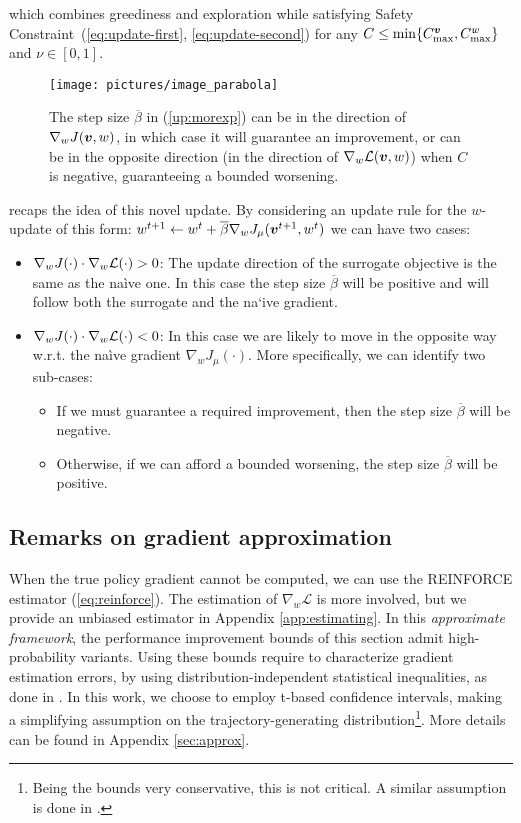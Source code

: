 which combines greediness and exploration while satisfying Safety Constraint~(\ref{eq:update-first}, \ref{eq:update-second}) for any ${C\leq\min\{C_{\text{max}}^{\vv},C_{\text{max}}^{w}\}}$ and $\nu\in[0,1]$. 

\begin{figure}
\texttt{[image: pictures/image\_parabola]}
\caption{The step size $\overline{\beta}$ in (\ref{up:morexp}) can be in the direction of $\gradJ[w]{\vv, w}$, in which case it will guarantee an improvement, or can be in the opposite direction (in the direction of $\gradDelta(\vv, w)$) when $C$ is negative, guaranteeing a bounded worsening. }
\label{fig:boobs}
\end{figure}

 recaps the idea of this novel update. By considering an update rule for the $w$-update of this form: $w^{t+1} \gets w^t + \overline{\beta} \nabla_w J_\mu(\vv^{t+1}, w^t)$ we can have two cases:
\begin{itemize}
\item $\nabla_w J(\cdot) \cdot \nabla_w \Deltav(\cdot) > 0$: The update direction of the surrogate objective is the same as the na\`ive one. In this case the step size $\overline{\beta}$ will be positive and will follow both the surrogate and the na`ive gradient.
\item $\nabla_w J(\cdot) \cdot \nabla_w \Deltav(\cdot) < 0$: In this case we are likely to move in the opposite way w.r.t. the na\`ive gradient $\nabla_w J_\mu(\cdot)$. More specifically, we can identify two sub-cases:
\begin{itemize}
\item If we must guarantee a required improvement, then the step size $\overline{\beta}$ will be negative.
\item Otherwise, if we can afford a bounded worsening, the step size $\overline{\beta}$ will be positive.
\end{itemize}
\end{itemize}

\subsection{Remarks on gradient approximation}\label{sec:approx_short}
When the true policy gradient cannot be computed, we can use the REINFORCE estimator (\ref{eq:reinforce}). The estimation of $\nabla_w\mathcal{L}$ is more involved, but we provide an unbiased estimator in Appendix \ref{app:estimating}. In this \textit{approximate framework}, the performance improvement bounds of this section admit high-probability variants. Using these bounds require to characterize gradient estimation errors, \eg by using distribution-independent statistical inequalities, as done in \cite{adaptive_batch}. In this work, we choose to employ t-based confidence intervals, making a simplifying assumption on the trajectory-generating distribution\footnote{Being the bounds very conservative, this is not critical. A similar assumption is done in \cite{pmlr-v37-thomas15}.}. More details can be found in Appendix \ref{sec:approx}.


